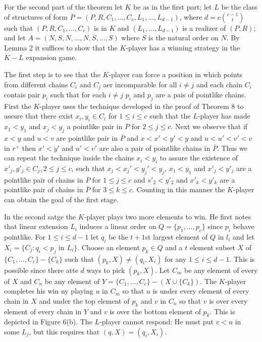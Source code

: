 \documentclass[twoside]{article}
\begin{document}
For the second part of the theorem let $K$ be as in the first part; let $L$ be the class
of structures of form $\overline{P} = (P,R,C_1,...,C_c,L_1,...,L_{d-1})$, where $d=c{{c-1}\choose {t}}$
such that $(P,R,C_1,...,C_c)$ is in $K$ and $(L_1,...,L_{d-1})$ is a realizer of $(P,R)$;
and let $A=(N,S,N,...,N,S,...,S)$ where $S$ is the natural order on $N$. By Lemma 2 it suffices to show that the $K$-player
has a winning strategy in the $K-L$ expansion game.

The first step is to see that the $K$-player can force a position in which points
from different chains $C_i$ and $C_j$ aer incomparable for all $i \neq j$ and each chain $C_i$ contais pair $p_i$ such that
for each $i \neq j$ $p_i$ and $p_j$ are a pais of pointlike chains. First the $K$-player uses the 
technique developed in the proof of Theorem 8 to assure that there exist $x_i,y_i \in C_i$
for $1 \leq i \leq c$ such that the $L$-player has made $x_1<y_1$ and $x_j< y_j$ a pointlike 
pair in $\overline{P}$ for $2 \leq j \leq c$. Next we observe that if $x<y$ and $u<v$ are pointlike pair in 
$\overline{P}$ and $x<x'<y'<y$ and $u<u'<v'<v$ in $r^+$ then $x'<y'$ and $u'<v'$ are also a pair of 
pointlike chains in $\overline{P}$. Thus we can repeat the technique inside the chains $x_i < y_i$
to assure the existence of $x'_j,y'_j \in C_j, 2 \leq j\leq c$, such that $x_j<x_j'<y_j'<y_j$,
$x_1<y_1$ and $x'_j<y'_j$ are a pointlike pair of chains in $\overline{P}$ for $1\leq j\leq c$ 
and $s'_2<y'_2$ and $x'_k < y'_k$ are a pointlike pair of chains in $\overline{P}$ for $3 \leq k \leq c$.
Counting in this manner the $K$-player can obtain the goal of the first stage.

In the second satge the $K$-player plays two more elements to win. He first notes that linear extension $L_i$
induces a linear order on $Q=\{p_1,...,p_c\}$ since $p_i$ behave pointlike. For $1\leq i \leq d-1$ let
$q_i$ be the $t+1$st largest element of $Q$ in $l_i$ and let $X_i = \{C_j:q_i<p_j$ in $ L_i\}$.
Choose an element $p_k \in Q$ and a $t$ element subset $X$ of $\{C_1,...,C_c\} - \{C_k\}$ such that
$(p_k,X) \neq (q_i, X_i)$ for any $1 \leq i \leq d-1$. This is possible since there atte $d$ ways to pick
$(p_k, X)$. Let $C_m$ be any element of every of $X$ and $C_n$ be any element of
$Y=\{C_1,...,C_c\}-(X\cup \{C_k\})$. The $K$-player completes his win ny playing $u$ in $C_m$ so that
$u$ is under every element of every chain in  $X$ and under the top element of $p_k$ and $v$ in $C_n$
so that $v$ is over every element of every chain in $Y$ and $v$ is over the bottom element of $p_k$.
This is depicted in Figure 6(b). The $L$-player cannot respond: He must put $v<u$ in some $L_j$, but
this requires that $(q,X)=(q_i,X_i)$.\\
\end{document}
